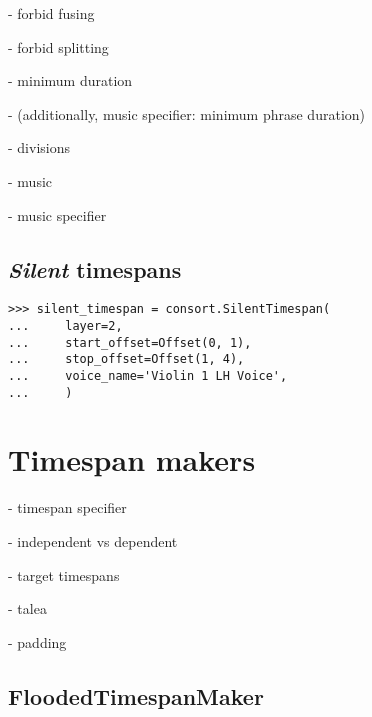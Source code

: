 - forbid fusing

- forbid splitting

- minimum duration

- (additionally, music specifier: minimum phrase duration)

- divisions

- music

- music specifier

\subsection{\emph{Silent} timespans}

\begin{comment}
<abjad>
silent_timespan = consort.SilentTimespan(
    layer=2,
    start_offset=Offset(0, 1),
    stop_offset=Offset(1, 4),
    voice_name='Violin 1 LH Voice',
    )
</abjad>
\end{comment}

\begin{singlespacing}
\vspace{-0.5\baselineskip}
\begin{lstlisting}
>>> silent_timespan = consort.SilentTimespan(
...     layer=2,
...     start_offset=Offset(0, 1),
...     stop_offset=Offset(1, 4),
...     voice_name='Violin 1 LH Voice',
...     )
\end{lstlisting}
\end{singlespacing}

\section{Timespan makers}

- timespan specifier

- independent vs dependent

- target timespans

- talea

- padding

\subsection{FloodedTimespanMaker}

\begin{comment}
<abjad>
flooded_timespan_maker = consort.FloodedTimespanMaker()
print(format(flooded_timespan_maker))
</abjad>
\end{comment}

